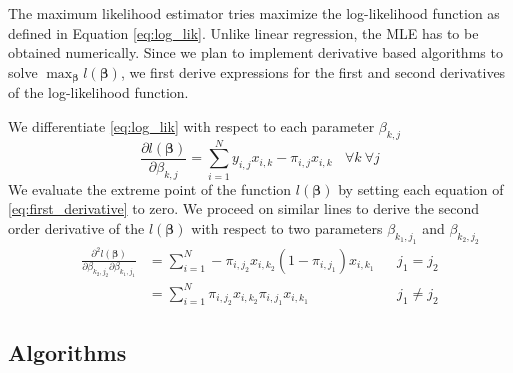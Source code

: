 \documentclass[12pt]{article}
\newcommand{\bS}[1] {\boldsymbol  #1}
\begin{document}
The maximum likelihood estimator tries maximize the log-likelihood function as defined in Equation \eqref{eq:log_lik}. Unlike linear regression, the MLE has to be obtained numerically. Since we plan to implement derivative based algorithms to solve $\max_{\bS{\beta}} l(\bS{\beta})$, we first derive expressions for the first and second derivatives of the log-likelihood function. 

We differentiate \eqref{eq:log_lik} with respect to each parameter $\beta_{k,j}$
\begin{equation}\label{eq:first_derivative}
\frac{\partial l(\bS{\beta})}{\partial \beta_{k,j}} = \sum_{i=1}^{N} y_{i,j}x_{i,k} - \pi_{i,j}x_{i,k} \ \ \ \ \forall k \  \forall j
\end{equation}
We  evaluate the extreme point of the function $l(\bS{\beta})$ by setting each equation of \eqref{eq:first_derivative} to zero. We proceed on similar lines to derive the second order derivative of the $l(\bS{\beta})$ with respect to two parameters $\beta_{k_1,j_1}$ and $\beta_{k_2,j_2}$
\begin{subequations}
\begin{align}\label{eq:second_derivative}
\frac{\partial^2 l(\bS{\beta})}{\partial \beta_{k_2,j_2} \partial \beta_{k_1,j_1}} 
&= \sum_{i=1}^{N} -\pi_{i,j_2}x_{i,k_2}(1-\pi_{i,j_1})x_{i,k_1} &&j_1 = j_2 \\
&= \sum_{i=1}^{N} \pi_{i,j_2}x_{i,k_2}\pi_{i,j_1}x_{i,k_1} &&j_1 \neq j_2 
\end{align}
\end{subequations}


\subsection{Algorithms}\label{sec:algorithms}
\end{document}

